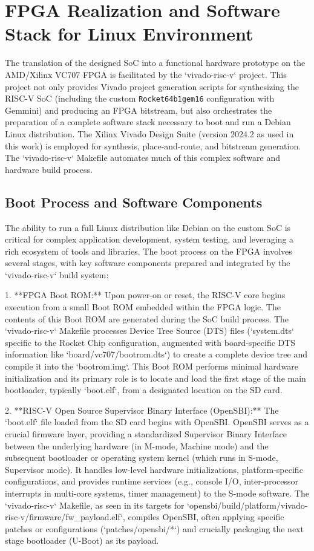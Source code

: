 \section{FPGA Realization and Software Stack for Linux Environment}
\label{sec:fpga_realization_software_stack}

The translation of the designed SoC into a functional hardware prototype on the AMD/Xilinx VC707 FPGA is facilitated by the `vivado-risc-v` project. This project not only provides Vivado project generation scripts for synthesizing the RISC-V SoC (including the custom \texttt{Rocket64b1gem16} configuration with Gemmini) and producing an FPGA bitstream, but also orchestrates the preparation of a complete software stack necessary to boot and run a Debian Linux distribution. The Xilinx Vivado Design Suite (version 2024.2 as used in this work) is employed for synthesis, place-and-route, and bitstream generation. The `vivado-risc-v` Makefile automates much of this complex software and hardware build process.

\subsection{Boot Process and Software Components}
The ability to run a full Linux distribution like Debian on the custom SoC is critical for complex application development, system testing, and leveraging a rich ecosystem of tools and libraries. The boot process on the FPGA involves several stages, with key software components prepared and integrated by the `vivado-risc-v` build system:

1.  **FPGA Boot ROM:** Upon power-on or reset, the RISC-V core begins execution from a small Boot ROM embedded within the FPGA logic. The contents of this Boot ROM are generated during the SoC build process. The `vivado-risc-v` Makefile processes Device Tree Source (DTS) files (`system.dts` specific to the Rocket Chip configuration, augmented with board-specific DTS information like `board/vc707/bootrom.dts`) to create a complete device tree and compile it into the `bootrom.img`. This Boot ROM performs minimal hardware initialization and its primary role is to locate and load the first stage of the main bootloader, typically `boot.elf`, from a designated location on the SD card.

2.  **RISC-V Open Source Supervisor Binary Interface (OpenSBI):** The `boot.elf` file loaded from the SD card begins with OpenSBI. OpenSBI serves as a crucial firmware layer, providing a standardized Supervisor Binary Interface between the underlying hardware (in M-mode, Machine mode) and the subsequent bootloader or operating system kernel (which runs in S-mode, Supervisor mode). It handles low-level hardware initializations, platform-specific configurations, and provides runtime services (e.g., console I/O, inter-processor interrupts in multi-core systems, timer management) to the S-mode software. The `vivado-risc-v` Makefile, as seen in its targets for `opensbi/build/platform/vivado-risc-v/firmware/fw\_payload.elf`, compiles OpenSBI, often applying specific patches or configurations (`patches/opensbi/*`) and crucially packaging the next stage bootloader (U-Boot) as its payload.

